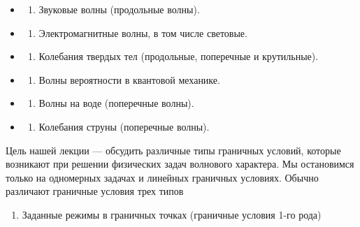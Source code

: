 \documentclass[
]{article}
\providecommand{\tightlist}{%
  \setlength{\itemsep}{0pt}\setlength{\parskip}{0pt}}
\begin{document}
\begin{itemize}
\tightlist
\item
  \begin{enumerate}
  \def\labelenumi{\arabic{enumi}.}
  \tightlist
  \item
    Звуковые волны (продольные волны).
  \end{enumerate}
\item
  \begin{enumerate}
  \def\labelenumi{\arabic{enumi}.}
  \setcounter{enumi}{1}
  \tightlist
  \item
    Электромагнитные волны, в том числе световые.
  \end{enumerate}
\item
  \begin{enumerate}
  \def\labelenumi{\arabic{enumi}.}
  \setcounter{enumi}{2}
  \tightlist
  \item
    Колебания твердых тел (продольные, поперечные и крутильные).
  \end{enumerate}
\item
  \begin{enumerate}
  \def\labelenumi{\arabic{enumi}.}
  \setcounter{enumi}{3}
  \tightlist
  \item
    Волны вероятности в квантовой механике.
  \end{enumerate}
\item
  \begin{enumerate}
  \def\labelenumi{\arabic{enumi}.}
  \setcounter{enumi}{4}
  \tightlist
  \item
    Волны на воде (поперечные волны).
  \end{enumerate}
\item
  \begin{enumerate}
  \def\labelenumi{\arabic{enumi}.}
  \setcounter{enumi}{5}
  \tightlist
  \item
    Колебания струны (поперечные волны).
  \end{enumerate}
\end{itemize}

Цель нашей лекции --- обсудить различные типы граничных условий, которые
возникают при решении физических задач волнового характера. Мы
остановимся только на одномерных задачах и линейных граничных условиях.
Обычно различают граничные условия трех типов

\begin{enumerate}
\def\labelenumi{\arabic{enumi}.}
\tightlist
\item
  Заданные режимы в граничных точках (граничные условия 1-го рода)
\end{enumerate}
\end{document}
